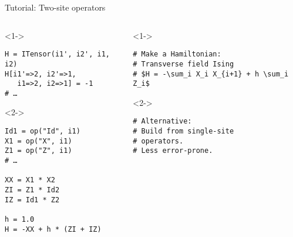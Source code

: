 \begin{frame}[fragile]{Tutorial: Two-site operators}


\begin{columns}

\begin{column}{5cm}

\begin{onlyenv}<1->

\begin{lstlisting}[language=JuliaLocal, style=julia, basicstyle=\small]
H = ITensor(i1', i2', i1, i2)
H[i1'=>2, i2'=>1,
   i1=>2, i2=>1] = -1
# …
\end{lstlisting}

\end{onlyenv}

\begin{onlyenv}<2->

\begin{lstlisting}[language=JuliaLocal, style=julia, basicstyle=\small]
Id1 = op("Id", i1)
X1 = op("X", i1)
Z1 = op("Z", i1)
# …

XX = X1 * X2
ZI = Z1 * Id2
IZ = Id1 * Z2

h = 1.0
H = -XX + h * (ZI + IZ)
\end{lstlisting}

\end{onlyenv}

\end{column}

\begin{column}{5cm}

\begin{onlyenv}<1->

\begin{lstlisting}[style=julia, numbers=none, mathescape, basicstyle=\small]
# Make a Hamiltonian:
# Transverse field Ising
# $H = -\sum_i X_i X_{i+1} + h \sum_i Z_i$
 \end{lstlisting}

\end{onlyenv}

\begin{onlyenv}<2->

\begin{lstlisting}[style=julia, numbers=none, mathescape, basicstyle=\small]
# Alternative:
# Build from single-site
# operators.
# Less error-prone.






 \end{lstlisting}

\end{onlyenv}

\end{column}

\end{columns}

\end{frame}
